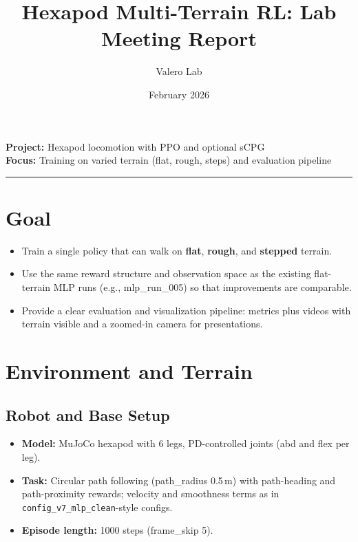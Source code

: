 \documentclass[11pt]{article}
\title{Hexapod Multi-Terrain RL: Lab Meeting Report}
\author{Valero Lab}
\date{February 2026}
\begin{document}
\maketitle

\textbf{Project:} Hexapod locomotion with PPO and optional sCPG \\
\textbf{Focus:} Training on varied terrain (flat, rough, steps) and evaluation pipeline

\vspace{0.5em}
\hrule
\vspace{0.5em}

\section{Goal}

\begin{itemize}
  \item Train a single policy that can walk on \textbf{flat}, \textbf{rough}, and \textbf{stepped} terrain.
  \item Use the same reward structure and observation space as the existing flat-terrain MLP runs (e.g., mlp\_run\_005) so that improvements are comparable.
  \item Provide a clear evaluation and visualization pipeline: metrics plus videos with terrain visible and a zoomed-in camera for presentations.
\end{itemize}

\section{Environment and Terrain}

\subsection{Robot and Base Setup}

\begin{itemize}
  \item \textbf{Model:} MuJoCo hexapod with 6 legs, PD-controlled joints (abd and flex per leg).
  \item \textbf{Task:} Circular path following (path\_radius 0.5\,m) with path-heading and path-proximity rewards; velocity and smoothness terms as in \texttt{config\_v7\_mlp\_clean}-style configs.
  \item \textbf{Episode length:} 1000 steps (frame\_skip 5).
\end{itemize}
\end{document}
